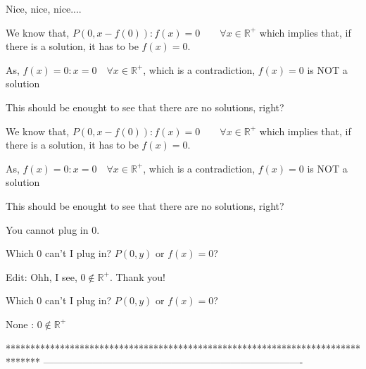 \begin{solution}
	Nice, nice, nice....
\end{solution}



\begin{solution}
	We know that,
$
P(0, x - f(0)) : f(x) = 0 \qquad \forall x \in \mathbb{R}^+
$
which implies that, if there is a solution, it has to be $f(x) = 0$.

As, $f(x) = 0 : x = 0 \quad \forall x \in \mathbb{R}^+$, which is a contradiction, $f(x) = 0$ is NOT a solution

This should be enought to see that there are no solutions, right?
\end{solution}



\begin{solution}
	\begin{tcolorbox}We know that,
$
P(0, x - f(0)) : f(x) = 0 \qquad \forall x \in \mathbb{R}^+
$
which implies that, if there is a solution, it has to be $f(x) = 0$.

As, $f(x) = 0 : x = 0 \quad \forall x \in \mathbb{R}^+$, which is a contradiction, $f(x) = 0$ is NOT a solution

This should be enought to see that there are no solutions, right?\end{tcolorbox}

You cannot plug in $0$.
\end{solution}



\begin{solution}
	Which $0$ can't I plug in? $P(0, y)$ or $f(x) = 0$?

Edit: Ohh, I see, $0 \not \in \mathbb{R}^+$. Thank you!
\end{solution}



\begin{solution}
	\begin{tcolorbox}Which $0$ can't I plug in? $P(0, y)$ or $f(x) = 0$?\end{tcolorbox}

None : $0\notin\mathbb R^+$
\end{solution}
*******************************************************************************
-------------------------------------------------------------------------------

